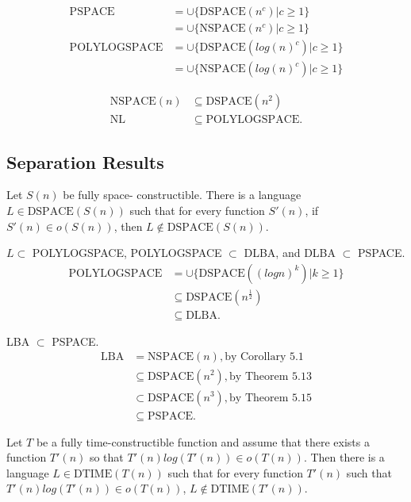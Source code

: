 \begin{align*}
  \text{PSPACE} &= \cup \{\text{DSPACE}(n^c) | c \ge 1\}\\
  &= \cup \{\text{NSPACE}(n^c) | c \ge 1\} \\
  \text{POLYLOGSPACE} &= \cup\{\text{DSPACE}(log(n)^c) | c \ge 1\}\\
  &= \cup \{\text{NSPACE}(log(n)^c) | c \ge 1\}
\end{align*}

\begin{align*}
\text{NSPACE}(n) &\subseteq \text{DSPACE}(n^2)\\
\text{NL} &\subseteq  \text{POLYLOGSPACE}.
\end{align*}

\subsection{Separation Results}

 Let $S(n)$ be fully space-
constructible. There is a language $L \in \text{DSPACE}(S(n))$ such that for every function
$S'(n)$, if $S'(n) \in o(S(n))$, then $L \notin \text{DSPACE}(S(n))$.

 $L \subset$ POLYLOGSPACE, POLYLOGSPACE $\subset$ DLBA, and DLBA
$\subset$ PSPACE.
\begin{align*}
\text{POLYLOGSPACE} &= \cup \{\text{DSPACE}((logn)^k ) | k \ge 1\}\\
&\subseteq \text{DSPACE}(n^\frac{1}{2})\\
&\subseteq \text{DLBA}.
\end{align*}

 LBA $\subset$ PSPACE.
\begin{align*}
\text{LBA} &= \text{NSPACE}(n), \text{by Corollary 5.1} \\
& \subseteq \text{DSPACE}(n^2 ), \text{by Theorem 5.13} \\
& \subset \text{DSPACE}(n^3 ), \text{by Theorem 5.15} \\
& \subseteq \text{PSPACE}.
\end{align*}

 Let $T$ be a fully time-constructible
function and assume that there exists a function $T'(n)$ so that
$T'(n)log(T'(n)) \in o(T(n))$.
Then there is a language $L \in \text{DTIME}(T(n))$ such that for every function 
$T'(n)$ such that $T'(n)log(T'(n)) \in o(T(n))$, $L \notin \text{DTIME}(T'(n))$.

